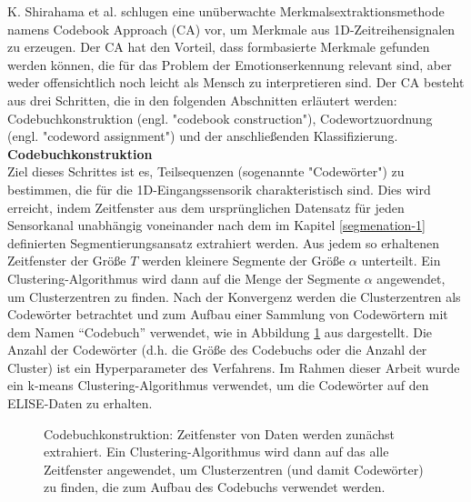 K. Shirahama et al. \cite{kimiaki_codebook_approach_2016} schlugen eine un{\"u}berwachte Merkmalsextraktionsmethode namens Codebook Approach (CA) vor, um Merkmale aus 1D-Zeitreihensignalen zu erzeugen.
Der CA hat den Vorteil, dass formbasierte Merkmale gefunden werden k{\"o}nnen, die f{\"u}r das Problem der Emotionserkennung relevant sind, aber weder offensichtlich noch leicht als Mensch zu interpretieren sind. 
Der CA besteht aus drei Schritten, die in den folgenden Abschnitten erl{\"a}utert werden: Codebuchkonstruktion (engl. "codebook construction"), Codewortzuordnung (engl. "codeword assignment") und der anschlie{\ss}enden Klassifizierung. \\


\textbf{Codebuchkonstruktion \\}
Ziel dieses Schrittes ist es, Teilsequenzen (sogenannte "Codew{\"o}rter") zu bestimmen, die f{\"u}r die 1D-Eingangssensorik charakteristisch sind. 
Dies wird erreicht, indem Zeitfenster aus dem urspr{\"u}nglichen Datensatz f{\"u}r jeden Sensorkanal unabh{\"a}ngig voneinander nach dem im Kapitel \ref{segmenation-1} definierten Segmentierungsansatz extrahiert werden.
Aus jedem so erhaltenen Zeitfenster der Gr{\"o}{\ss}e $T$ werden kleinere Segmente der Gr{\"o}{\ss}e $\alpha$ unterteilt.
Ein Clustering-Algorithmus wird dann auf die Menge der Segmente $\alpha$ angewendet, um Clusterzentren zu finden.
Nach der Konvergenz werden die Clusterzentren als Codew{\"o}rter betrachtet und zum Aufbau einer Sammlung von Codew{\"o}rtern mit dem Namen ``Codebuch'' verwendet, wie in Abbildung \ref{fig:ca_construction} aus \cite{kimiaki_codebook_approach_2016} dargestellt. 
Die Anzahl der Codew{\"o}rter (d.h. die Gr{\"o}{\ss}e des Codebuchs oder die Anzahl der Cluster) ist ein Hyperparameter des Verfahrens. Im Rahmen dieser Arbeit wurde ein k-means Clustering-Algorithmus verwendet, um die Codew{\"o}rter auf den ELISE-Daten zu erhalten. \\


\begin{figure}[h]
\caption[Codebuchkonstruktion]{Codebuchkonstruktion: Zeitfenster von Daten werden zun{\"a}chst extrahiert. Ein Clustering-Algorithmus wird dann auf das alle Zeitfenster angewendet, um Clusterzentren (und damit Codew{\"o}rter) zu finden, die zum Aufbau des Codebuchs verwendet werden. }
\label{fig:ca_construction} \end{figure} \vspace{0.5cm}


